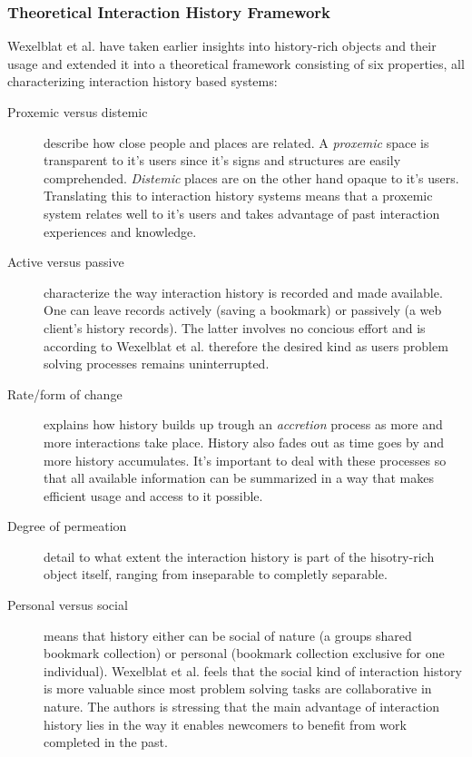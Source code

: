 \documentclass[12pt,a4paper]{article}
\begin{document}
\subsubsection{Theoretical Interaction History Framework}

Wexelblat et al. have taken earlier insights into history-rich objects and
their usage \cite{hill92, hill94} and extended it into a theoretical framework
consisting of six properties, all characterizing interaction history based
systems:

\begin{description}
  \item[Proxemic versus distemic] describe how close people and places are
    related. A \emph{proxemic} space is transparent to it's users since it's
    signs and structures are easily comprehended. \emph{Distemic} places are on
    the other hand opaque to it's users. Translating this to interaction
    history systems means that a proxemic system relates well to it's users
    and takes advantage of past interaction experiences and knowledge.
  \item[Active versus passive] characterize the way interaction history is
    recorded and made available. One can leave records actively (saving a
    bookmark) or passively (a web client's history records). The latter
    involves no
    concious effort and is according to Wexelblat et al. therefore the desired
    kind as users problem solving processes remains uninterrupted.
  \item[Rate/form of change] explains how history builds up trough an
    \emph{accretion} process as more and more interactions take place. History
    also fades out as time goes by and more history accumulates. It's important
    to deal with these processes so that all available information can be
    summarized in a way that makes efficient usage and access to it possible.
  \item[Degree of permeation] detail to what extent the interaction history is
    part of the hisotry-rich object itself, ranging from inseparable to
    completly separable.
  \item[Personal versus social] means that history either can be social of
    nature (a groups shared bookmark collection) or personal (bookmark
    collection exclusive for one individual). Wexelblat et al. feels that
    the social kind of interaction history is more valuable since most problem
    solving tasks are collaborative in nature. The authors is stressing that
    the main advantage of interaction history lies in the way it enables
    newcomers to benefit from work completed in the past.
    

\end{description}
\end{document}
